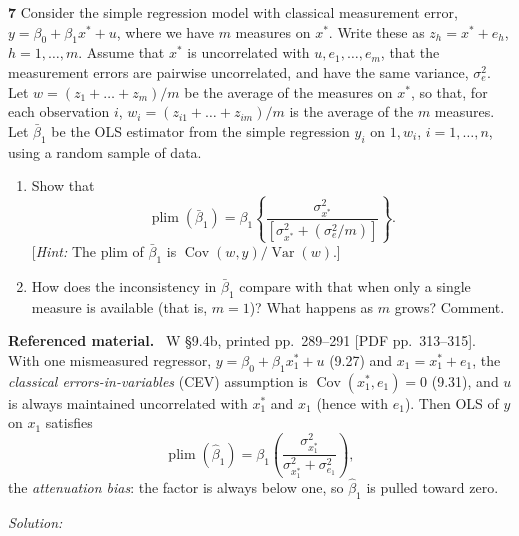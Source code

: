 \documentclass[11pt,a4paper]{article}
\newif\ifsolucoes
\newcommand{\espacoresol}{4.5cm}   %
\newenvironment{refmaterial}{\par\smallskip\noindent\begingroup\small\textbf{Referenced material.}~}{\endgroup\par\smallskip}
\newcommand{\resolespaco}{\ifsolucoes\else\par\textit{Solution:}\vspace{\espacoresol}\par\fi}
\begin{document}
\noindent\textbf{7} Consider the simple regression model with classical measurement error,
$y=\beta_0+\beta_1x^*+u$, where we have $m$ measures on $x^*$. Write these as $z_h=x^*+e_h$,
$h=1,\dots,m$. Assume that $x^*$ is uncorrelated with $u,e_1,\dots,e_m$, that the measurement errors are
pairwise uncorrelated, and have the same variance, $\sigma_e^2$. Let $w=(z_1+\dots+z_m)/m$ be the average
of the measures on $x^*$, so that, for each observation $i$, $w_i=(z_{i1}+\dots+z_{im})/m$ is the average of
the $m$ measures. Let $\bar\beta_1$ be the OLS estimator from the simple regression $y_i$ on $1,w_i$,
$i=1,\dots,n$, using a random sample of data.
\begin{enumerate}[label=(\roman*)]
\item Show that
\[
\operatorname{plim}(\bar\beta_1)=\beta_1\left\{\frac{\sigma_{x^*}^2}{[\sigma_{x^*}^2+(\sigma_e^2/m)]}\right\}.
\]
[\textit{Hint:} The plim of $\bar\beta_1$ is $\operatorname{Cov}(w,y)/\operatorname{Var}(w)$.]
\item How does the inconsistency in $\bar\beta_1$ compare with that when only a single measure is available
(that is, $m=1$)? What happens as $m$ grows? Comment.
\end{enumerate}
\begin{refmaterial}
W \S9.4b, printed pp.~289--291 [PDF pp.~313--315]. With one mismeasured regressor, $y=\beta_0+\beta_1x_1^*+u$
(9.27) and $x_1=x_1^*+e_1$, the \emph{classical errors-in-variables} (CEV) assumption is
$\operatorname{Cov}(x_1^*,e_1)=0$ (9.31), and $u$ is always maintained uncorrelated with $x_1^*$ and $x_1$
(hence with $e_1$). Then OLS of $y$ on $x_1$ satisfies
\[
\operatorname{plim}(\hat\beta_1)=\beta_1\left(\frac{\sigma_{x_1^*}^2}{\sigma_{x_1^*}^2+\sigma_{e_1}^2}\right),\tag{9.33}
\]
the \emph{attenuation bias}: the factor is always below one, so $\hat\beta_1$ is pulled toward zero.
\end{refmaterial}
\resolespaco
\end{document}
